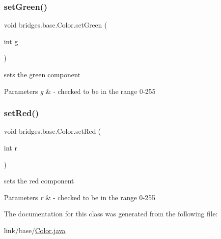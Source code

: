 \hypertarget{classbridges_1_1base_1_1_color_a415a28133ade4e216c02ecdfc8a32a1d}{}\label{classbridges_1_1base_1_1_color_a415a28133ade4e216c02ecdfc8a32a1d} 
\subsubsection{\texorpdfstring{set\+Green()}{setGreen()}}
{\footnotesize\ttfamily void bridges.\+base.\+Color.\+set\+Green (\begin{DoxyParamCaption}\item[{int}]{g }\end{DoxyParamCaption})}

sets the green component


\begin{DoxyParams}{Parameters}
{\em g} & -\/ checked to be in the range 0-\/255 \\
\hline
\end{DoxyParams}
\hypertarget{classbridges_1_1base_1_1_color_a1d78967703924b709e76def5b2b3ee9a}{}\label{classbridges_1_1base_1_1_color_a1d78967703924b709e76def5b2b3ee9a} 
\subsubsection{\texorpdfstring{set\+Red()}{setRed()}}
{\footnotesize\ttfamily void bridges.\+base.\+Color.\+set\+Red (\begin{DoxyParamCaption}\item[{int}]{r }\end{DoxyParamCaption})}

sets the red component


\begin{DoxyParams}{Parameters}
{\em r} & -\/ checked to be in the range 0-\/255 \\
\hline
\end{DoxyParams}


The documentation for this class was generated from the following file\+:\begin{DoxyCompactItemize}
\item 
link/base/\hyperlink{_color_8java}{Color.\+java}\end{DoxyCompactItemize}
